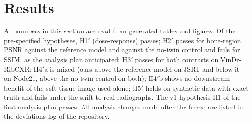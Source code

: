 \section{Results}
\label{sec:results}
All numbers in this section are read from generated tables and figures. Of the pre-specified hypotheses, H1$'$ (dose-response) passes;
H2$'$ passes for bone-region PSNR against the reference model and against the no-twin control and fails for SSIM, as the analysis plan
anticipated; H3$'$ passes for both contrasts on VinDr-RibCXR; H4$'$a is mixed (ours above the reference model on JSRT and below it on Node21,
above the no-twin control on both); H4$'$b shows no downstream benefit of the soft-tissue image used alone; H5$'$ holds on synthetic data with
exact truth and fails under the shift to real radiographs. The v1 hypothesis H1 of the first analysis plan passes. All analysis changes made
after the freeze are listed in the deviations log of the repository.

